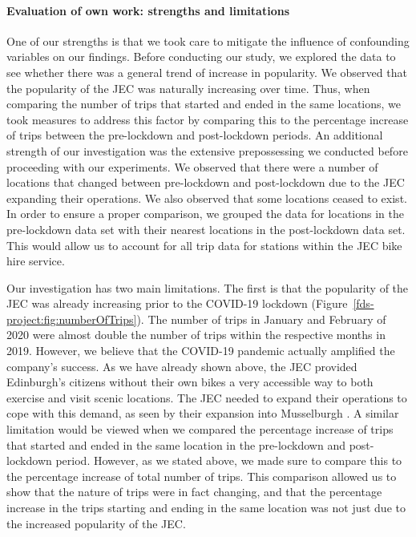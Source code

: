 \documentclass[11pt,a4paper]{article}
\begin{document}
\paragraph{Evaluation of own work: strengths and limitations}\label{evaluation}
One of our strengths is that we took care to mitigate the influence of confounding variables on our findings. Before conducting our study, we explored the data to see whether there was a general trend of increase in popularity. We observed that the popularity of the JEC was naturally increasing over time. Thus, when comparing the number of trips that started and ended in the same locations, we took measures to address this factor by comparing this to the percentage increase of trips between the pre-lockdown and post-lockdown periods. An additional strength of our investigation was the extensive prepossessing we conducted before proceeding with our experiments. We observed that there were a number of locations that changed between pre-lockdown and post-lockdown due to the JEC expanding their operations. We also observed that some locations ceased to exist. In order to ensure a proper comparison, we grouped the data for locations in the pre-lockdown data set with their nearest locations in the post-lockdown data set. This would allow us to account for all trip data for stations within the JEC bike hire service.\par Our investigation has two main limitations. The first is that the popularity of the JEC was already increasing prior to the COVID-19 lockdown (Figure~\ref{fds-project:fig:numberOfTrips}). The number of trips in January and February of 2020 were almost double the number of trips within the respective months in 2019. However, we believe that the COVID-19 pandemic actually amplified the company's success. As we have already shown above, the JEC provided Edinburgh's citizens without their own bikes a very accessible way to both exercise and visit scenic locations. The JEC needed to expand their operations to cope with this demand, as seen by their expansion into Musselburgh \cite{Dalton1}. A similar limitation would be viewed when we compared the percentage increase of trips that started and ended in the same location in the pre-lockdown and post-lockdown period. However, as we stated above, we made sure to compare this to the percentage increase of total number of trips. This comparison allowed us to show that the nature of trips were in fact changing, and that the percentage increase in the trips starting and ending in the same location was not just due to the increased popularity of the JEC.
\end{document}
